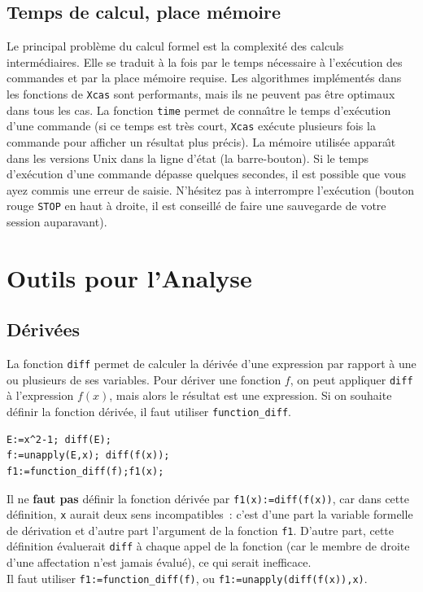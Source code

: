\documentclass{article}
\begin{document}
\subsection{Temps de calcul, place m\'emoire}
%
Le principal probl\`eme du calcul formel est la complexit\'e des 
calculs interm\'ediaires. Elle se traduit \`a la fois par le temps
n\'ecessaire \`a l'ex\'ecution des commandes et par la place m\'emoire
requise. Les algorithmes impl\'ement\'es dans les fonctions
de {\tt Xcas} sont performants, mais ils ne
peuvent pas \^etre optimaux dans tous les cas. La fonction \verb|time| 
permet de conna\^\i tre le temps d'ex\'ecution d'une commande (si ce temps
est tr\`es court, {\tt Xcas} ex\'ecute plusieurs fois la commande pour
afficher un r\'esultat plus pr\'ecis). La m\'emoire utilis\'ee 
appara\^\i t dans les versions Unix dans la ligne d'\'etat
(la barre-bouton). Si le temps d'ex\'ecution d'une
commande d\'epasse quelques secondes, il est possible que vous ayez
commis une erreur de saisie. N'h\'esitez pas \`a interrompre
l'ex\'ecution (bouton rouge \verb|STOP| en haut \`a droite, il est
conseill\'e de faire une sauvegarde de votre session auparavant).

\section{Outils pour l'Analyse}
%
\subsection{D\'eriv\'ees}
%
La fonction \verb|diff| permet de calculer la d\'eriv\'ee d'une
expression par rapport \`a une ou plusieurs de ses variables. Pour
d\'eriver une fonction $f$, 
on peut appliquer \verb|diff| \`a l'expression $f(x)$, mais alors le
r\'esultat est une expression. Si on souhaite d\'efinir la fonction
d\'eriv\'ee, il faut utiliser \verb|function_diff|.
\begin{verbatim}
E:=x^2-1; diff(E);
f:=unapply(E,x); diff(f(x));
f1:=function_diff(f);f1(x);
\end{verbatim}
Il ne {\bf faut pas} d\'efinir la fonction d\'eriv\'ee par
\verb|f1(x):=diff(f(x))|, car dans cette d\'efinition, \verb|x| aurait 
deux sens incompatibles~: c'est d'une part la
variable formelle de d\'erivation et d'autre part l'argument
de la fonction \verb|f1|. D'autre part, cette d\'efinition
\'evaluerait \verb|diff| \`a chaque appel de la fonction (car
le membre de droite d'une affectation n'est jamais \'evalu\'e), ce 
qui serait inefficace.\\ Il faut utiliser
\verb|f1:=function_diff(f)|, 
ou
\verb|f1:=unapply(diff(f(x)),x)|.
\end{document}
